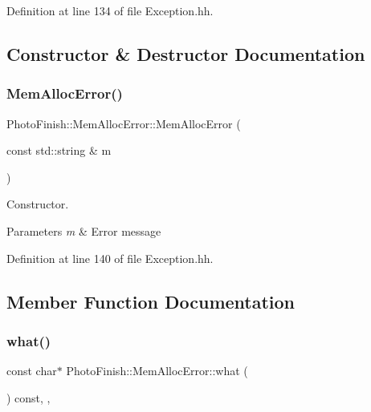 Definition at line 134 of file Exception.\+hh.



\subsection{Constructor \& Destructor Documentation}
\mbox{\label{class_photo_finish_1_1_mem_alloc_error_ad9c18ee333d465217ced55e75500e210}} 
\subsubsection{\texorpdfstring{Mem\+Alloc\+Error()}{MemAllocError()}}
{\footnotesize\ttfamily Photo\+Finish\+::\+Mem\+Alloc\+Error\+::\+Mem\+Alloc\+Error (\begin{DoxyParamCaption}\item[{const std\+::string \&}]{m }\end{DoxyParamCaption})\hspace{0.3cm}{\ttfamily [inline]}}



Constructor. 


\begin{DoxyParams}{Parameters}
{\em m} & Error message \\
\hline
\end{DoxyParams}


Definition at line 140 of file Exception.\+hh.



\subsection{Member Function Documentation}
\mbox{\label{class_photo_finish_1_1_mem_alloc_error_af7d792c61c12e9db04ad6f62520c1e06}} 
\subsubsection{\texorpdfstring{what()}{what()}}
{\footnotesize\ttfamily const char$\ast$ Photo\+Finish\+::\+Mem\+Alloc\+Error\+::what (\begin{DoxyParamCaption}{ }\end{DoxyParamCaption}) const\hspace{0.3cm}{\ttfamily [inline]}, {\ttfamily [virtual]}, {\ttfamily [noexcept]}}



